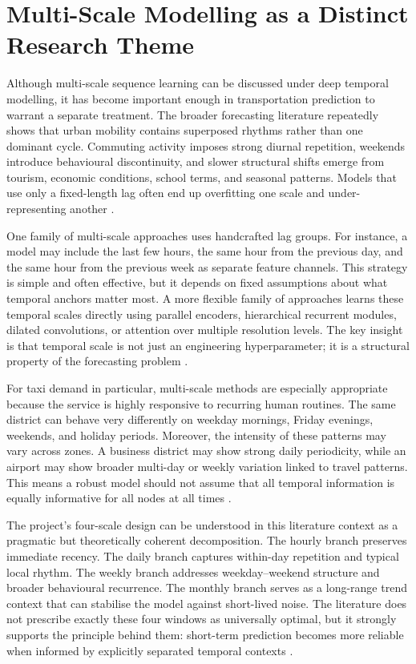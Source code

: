 \documentclass[12pt,a4paper]{report}
\begin{document}
\section{Multi-Scale Modelling as a Distinct Research Theme}

Although multi-scale sequence learning can be discussed under deep temporal modelling, it has become important enough in transportation prediction to warrant a separate treatment. The broader forecasting literature repeatedly shows that urban mobility contains superposed rhythms rather than one dominant cycle. Commuting activity imposes strong diurnal repetition, weekends introduce behavioural discontinuity, and slower structural shifts emerge from tourism, economic conditions, school terms, and seasonal patterns. Models that use only a fixed-length lag often end up overfitting one scale and under-representing another \cite{tang2019spatiotemporal,liao2022taxi}.

One family of multi-scale approaches uses handcrafted lag groups. For instance, a model may include the last few hours, the same hour from the previous day, and the same hour from the previous week as separate feature channels. This strategy is simple and often effective, but it depends on fixed assumptions about what temporal anchors matter most. A more flexible family of approaches learns these temporal scales directly using parallel encoders, hierarchical recurrent modules, dilated convolutions, or attention over multiple resolution levels. The key insight is that temporal scale is not just an engineering hyperparameter; it is a structural property of the forecasting problem \cite{huang2021multiresolution,lim2021survey}.

For taxi demand in particular, multi-scale methods are especially appropriate because the service is highly responsive to recurring human routines. The same district can behave very differently on weekday mornings, Friday evenings, weekends, and holiday periods. Moreover, the intensity of these patterns may vary across zones. A business district may show strong daily periodicity, while an airport may show broader multi-day or weekly variation linked to travel patterns. This means a robust model should not assume that all temporal information is equally informative for all nodes at all times \cite{tang2019spatiotemporal,liao2022taxi}.

The project's four-scale design can be understood in this literature context as a pragmatic but theoretically coherent decomposition. The hourly branch preserves immediate recency. The daily branch captures within-day repetition and typical local rhythm. The weekly branch addresses weekday--weekend structure and broader behavioural recurrence. The monthly branch serves as a long-range trend context that can stabilise the model against short-lived noise. The literature does not prescribe exactly these four windows as universally optimal, but it strongly supports the principle behind them: short-term prediction becomes more reliable when informed by explicitly separated temporal contexts \cite{liao2022taxi,huang2021multiresolution,lim2021survey}.
\end{document}
